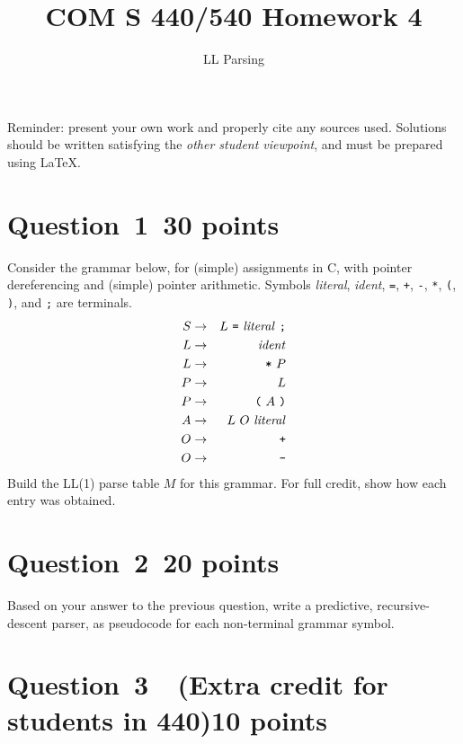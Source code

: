\documentclass[10pt]{article}
\title{COM S 440/540 Homework 4}
\date{}
\author{LL Parsing}
\begin{document}
\maketitle

\noindent
Reminder: present your own work and properly cite any sources used.
Solutions should be written satisfying the \emph{other student viewpoint},
and must be prepared using \LaTeX.
\renewcommand{\thepage}{~}
\section*{Question~1~\hfill 30 points}

Consider the grammar below,
for (simple) assignments in C, with pointer dereferencing
and (simple) pointer arithmetic.
Symbols \emph{literal}, \emph{ident}, \verb|=|, \verb|+|, \verb|-|, \verb|*|,
\verb|(|, \verb|)|,
and \verb|;|
are terminals.
\begin{eqnarray}
  S & \rightarrow & L ~ \verb|=| ~ \mathit{literal} ~ \verb|;|
\\
  L & \rightarrow & \mathit{ident}
\\
	L & \rightarrow & \verb|*| ~ P
\\
	P & \rightarrow & L
\\
  P & \rightarrow & \verb|(| ~ A ~ \verb|)|
\\
  A & \rightarrow & L ~ O ~ \mathit{literal}
\\
  O & \rightarrow & \verb|+|
\\
  O & \rightarrow & \verb|-|
\end{eqnarray}
Build the LL(1) parse table $M$ for this grammar.
For full credit, show how each entry was obtained.

\section*{Question~2~\hfill 20 points}

Based on your answer to the previous question, 
write a predictive, recursive-descent parser,
as pseudocode for each non-terminal grammar symbol.


\section*{Question~3~~(Extra credit for students in 440)\hfill 10 points}
\end{document}
